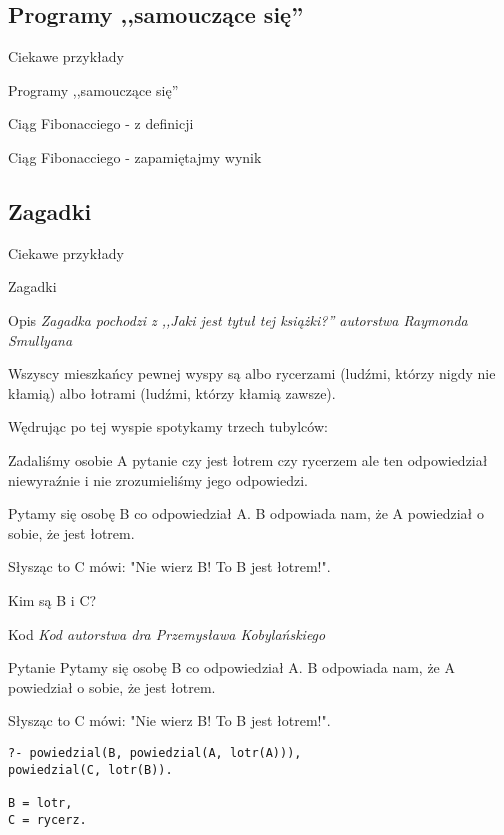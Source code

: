 \documentclass[blue]{beamer}
\newcommand{\tytulprz}[2]{\begin{frame}\begin{center}\begin{Huge}Ciekawe przykłady\end{Huge}

\hspace{20pt}

\begin{huge}#1\end{huge}

\hspace{10pt}

\begin{large}#2\end{large}\end{center}\end{frame}}
\begin{document}
\subsection{Programy ,,samouczące się''}
\tytulprz{Programy ,,samouczące się''}{}
\begin{frame}{Ciąg Fibonacciego - z definicji}


\end{frame}
\begin{frame}{Ciąg Fibonacciego - zapamiętajmy wynik}

\end{frame}
\subsection{Zagadki}
\tytulprz{Zagadki}{}
\begin{frame}{Opis}
\textit{Zagadka pochodzi z ,,Jaki jest tytuł tej książki?'' autorstwa Raymonda Smullyana}

Wszyscy mieszkańcy pewnej wyspy są albo rycerzami (ludźmi, którzy nigdy nie kłamią) albo łotrami (ludźmi, którzy kłamią zawsze).

Wędrując po tej wyspie spotykamy trzech tubylców:

Zadaliśmy osobie A pytanie czy jest łotrem czy rycerzem ale ten odpowiedział niewyraźnie i nie zrozumieliśmy jego odpowiedzi.

Pytamy się osobę B co odpowiedział A. B odpowiada nam, że A powiedział o sobie, że jest łotrem.

Słysząc to C mówi: "Nie wierz B! To B jest łotrem!".

Kim są B i C?
\end{frame}
\begin{frame}{Kod}
\textit{Kod autorstwa dra Przemysława Kobylańskiego}

\end{frame}
\begin{frame}[fragile]{Pytanie}
Pytamy się osobę B co odpowiedział A. B odpowiada nam, że A powiedział o sobie, że jest łotrem.

Słysząc to C mówi: "Nie wierz B! To B jest łotrem!".
\begin{lstlisting}
?- powiedzial(B, powiedzial(A, lotr(A))),
powiedzial(C, lotr(B)).

B = lotr,
C = rycerz.
\end{lstlisting}
\end{frame}
\end{document}

